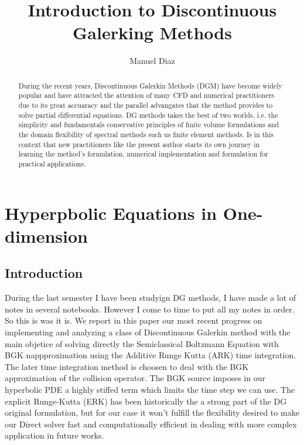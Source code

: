 \documentclass[11pt,fleqn]{report}
\begin{document}
\title{Introduction to Discontinuous Galerking Methods}
\author{Manuel Diaz}
\maketitle

\tableofcontents 

\begin{abstract}
During the recent years, Discontinuous Galerkin Methods (DGM) have become widely popular and have attracted the attention of many CFD and numerical practitioners due to its great accuaracy and the parallel advangates that the method provides to solve partial differential equations. DG methods takes the best of two worlds, i.e. the simplicity and fundamentals conservative principles of finite volume formulations and the domain flexibility of spectral methods such us finite element methods. Is in this context that new practitioners like the present author starts its own journey in learning the method's formulation, numerical implementation and formulation for practical applications. 
\end{abstract}

\chapter{Hyperpbolic Equations in One-dimension}

\section{Introduction}
During the last semester I have been studyign DG methods, I have made a lot of notes in several notebooks. However I come to time to put all my notes in order. So this is was it is.
We report in this paper our most recent progress on implementing and analyzing a class of Discontinuous Galerkin method with the main objetice of solving directly the Semiclassical Boltzmann Equation with BGK nappproximation using the Additive Runge Kutta (ARK) time integration. The later time integration method is choosen to deal with the BGK approximation of the collision operator. The BGK source imposes in our hyperbolic PDE a highly stiffed term which limits the time step we can use. The explicit Runge-Kutta (ERK) has been historically the a strong part of the DG original formulation, but for our case it won't fulfill the flexibility desired to make our Direct solver fast and computationally efficient in dealing with more complex application in future works.
\end{document}
